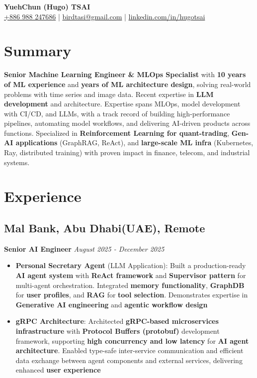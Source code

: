 \documentclass[a4paper,9pt]{extarticle}
\begin{document}
\begin{center}
    {\LARGE \textbf{YuehChun (Hugo) TSAI}}\\[0.2em]
    \href{tel:+886988247686}{+886 988 247686} \hspace{1em} | \hspace{1em}
    \href{mailto:birdtasi@gmail.com}{birdtasi@gmail.com} \hspace{1em} | \hspace{1em}
    \href{https://linkedin.com/in/hugotsai}{linkedin.com/in/hugotsai} \hspace{1em}
\end{center}

\section*{Summary}
\textbf{Senior Machine Learning Engineer \& MLOps Specialist} with \textbf{10 years of ML experience} and \textbf{years of ML architecture design}, solving real-world problems with time series and image data. Recent expertise in \textbf{LLM development} and architecture. Expertise spans MLOps, model development with CI/CD, and LLMs, with a track record of building high-performance pipelines, automating model workflows, and delivering AI-driven products across functions. Specialized in \textbf{Reinforcement Learning for quant-trading}, \textbf{Gen-AI applications} (GraphRAG, ReAct), and \textbf{large-scale ML infra} (Kubernetes, Ray, distributed training) with proven impact in finance, telecom, and industrial systems.

\section*{Experience}

\subsection*{Mal Bank, Abu Dhabi(UAE), Remote}
\textbf{Senior AI Engineer} \hfill \textit{August 2025 - December 2025}

\begin{itemize}[leftmargin=1em,itemsep=0.15em,parsep=0pt]
    \item \textbf{Personal Secretary Agent} (LLM Application): Built a production-ready \textbf{AI agent system} with \textbf{ReAct framework} and \textbf{Supervisor pattern} for multi-agent orchestration. Integrated \textbf{memory functionality}, \textbf{GraphDB} for \textbf{user profiles}, and \textbf{RAG} for \textbf{tool selection}. Demonstrates expertise in \textbf{Generative AI engineering} and \textbf{agentic workflow design}
    \item \textbf{gRPC Architecture}: Architected \textbf{gRPC-based microservices infrastructure} with \textbf{Protocol Buffers (protobuf)} development framework, supporting \textbf{high concurrency and low latency} for \textbf{AI agent architecture}. Enabled type-safe inter-service communication and efficient data exchange between agent components and external services, delivering enhanced \textbf{user experience}
\end{itemize}
\end{document}
